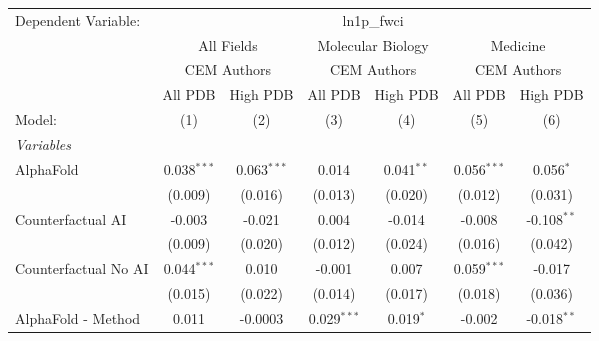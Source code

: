 \begingroup
\centering
\begin{tabular}{lcccccc}
   \tabularnewline \midrule \midrule
   Dependent Variable: & \multicolumn{6}{c}{ln1p\_fwci}\\
 & \multicolumn{2}{c}{All Fields} & \multicolumn{2}{c}{Molecular Biology} & \multicolumn{2}{c}{Medicine} \\
\cmidrule(lr){2-3} \cmidrule(lr){4-5} \cmidrule(lr){6-7}
 & \multicolumn{2}{c}{CEM Authors} & \multicolumn{2}{c}{CEM Authors} & \multicolumn{2}{c}{CEM Authors} \\
\cmidrule(lr){2-3} \cmidrule(lr){4-5} \cmidrule(lr){6-7}
 & \multicolumn{1}{c}{All PDB} & \multicolumn{1}{c}{High PDB} & \multicolumn{1}{c}{All PDB} & \multicolumn{1}{c}{High PDB} & \multicolumn{1}{c}{All PDB} & \multicolumn{1}{c}{High PDB} \\
\cmidrule(lr){2-2} \cmidrule(lr){3-3} \cmidrule(lr){4-4} \cmidrule(lr){5-5} \cmidrule(lr){6-6} \cmidrule(lr){7-7}
   Model:                                                     & (1)            & (2)           & (3)            & (4)           & (5)           & (6)\\  
   \midrule
   \emph{Variables}\\
   AlphaFold                                                  & 0.038$^{***}$  & 0.063$^{***}$ & 0.014          & 0.041$^{**}$  & 0.056$^{***}$ & 0.056$^{*}$\\   
                                                              & (0.009)        & (0.016)       & (0.013)        & (0.020)       & (0.012)       & (0.031)\\   
   Counterfactual AI                                          & -0.003         & -0.021        & 0.004          & -0.014        & -0.008        & -0.108$^{**}$\\   
                                                              & (0.009)        & (0.020)       & (0.012)        & (0.024)       & (0.016)       & (0.042)\\   
   Counterfactual No AI                                       & 0.044$^{***}$  & 0.010         & -0.001         & 0.007         & 0.059$^{***}$ & -0.017\\   
                                                              & (0.015)        & (0.022)       & (0.014)        & (0.017)       & (0.018)       & (0.036)\\   
   AlphaFold - Method                                         & 0.011          & -0.0003       & 0.029$^{***}$  & 0.019$^{*}$   & -0.002        & -0.018$^{**}$\\   

\end{tabular}
